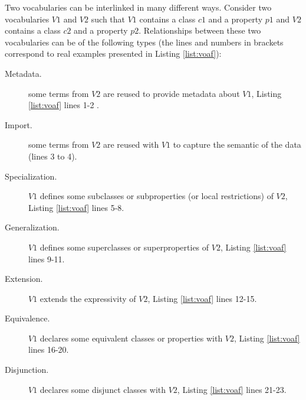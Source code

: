 \documentclass{iosart2c}
\begin{document}
Two vocabularies can be interlinked in many different ways. Consider two vocabularies $V1$ and $V2$ such that $V1$ contains a class $c1$ and a property $p1$ and $V2$ contains a class $c2$ and a property $p2$. Relationships between these two vocabularies can be of the following types (the lines and numbers in brackets correspond to real examples presented in Listing \ref{list:voaf}):

		\begin{description}
			\item [Metadata.] some terms from $V2$ are reused to provide metadata about $V1$, Listing \ref{list:voaf} lines 1-2 .

			\item [Import.] some terms from $V2$ are reused with $V1$ to capture the semantic of the data (lines 3 to 4).

			\item [Specialization.] $V1$ defines some subclasses or subproperties (or local restrictions) of $V2$, Listing \ref{list:voaf} lines 5-8.

			\item [Generalization.] $V1$ defines some superclasses or superproperties of $V2$, Listing \ref{list:voaf} lines 9-11.

			\item [Extension.] $V1$ extends the expressivity of $V2$, Listing \ref{list:voaf} lines 12-15.

			\item [Equivalence.] $V1$ declares some equivalent classes or properties with $V2$, Listing \ref{list:voaf} lines 16-20.

			\item [Disjunction.] $V1$ declares some disjunct classes with $V2$, Listing \ref{list:voaf} lines 21-23.
		\end{description}
\end{document}
